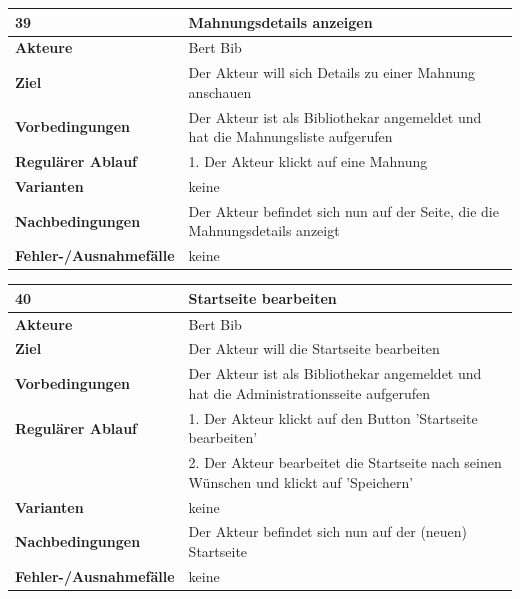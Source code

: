 \documentclass[fontsize=12pt,paper=a4,twoside]{scrartcl}
\begin{document}
\begin{table}[htbp]
\label{39}
\begin{tabular}{|l|p{10cm}|}
\hline 
\textbf{39} & \textbf{Mahnungsdetails anzeigen} \\ \hline
\textbf{Akteure} & Bert Bib\\ \hline
\textbf{Ziel} & Der Akteur will sich Details zu einer Mahnung anschauen \\ \hline
\textbf{Vorbedingungen} & Der Akteur ist als Bibliothekar angemeldet und hat die Mahnungsliste 
aufgerufen \\ \hline
\textbf{Regulärer Ablauf} & 
1. Der Akteur klickt auf eine Mahnung \\
\hline
\textbf{Varianten} & 
keine \\ \hline
\textbf{Nachbedingungen} & Der Akteur befindet sich nun auf der Seite, die die Mahnungsdetails 
anzeigt\\ \hline
\textbf{Fehler-/Ausnahmefälle} & keine\\
\hline
\end{tabular}
\end{table}

\newpage
\begin{table}[htbp]
\label{40}
\begin{tabular}{|l|p{10cm}|}
\hline 
\textbf{40} & \textbf{Startseite bearbeiten} \\ \hline
\textbf{Akteure} & Bert Bib\\ \hline
\textbf{Ziel} & Der Akteur will die Startseite bearbeiten \\ \hline
\textbf{Vorbedingungen} & Der Akteur ist als Bibliothekar angemeldet und hat die 
Administrationsseite aufgerufen\\\hline
\textbf{Regulärer Ablauf} & 
1. Der Akteur klickt auf den Button 'Startseite bearbeiten' \\
&2. Der Akteur bearbeitet die Startseite nach seinen Wünschen und klickt auf 'Speichern'\\
\hline
\textbf{Varianten} & 
keine \\ \hline
\textbf{Nachbedingungen} & Der Akteur befindet sich nun auf der (neuen) Startseite \\ \hline
\textbf{Fehler-/Ausnahmefälle} & keine\\
\hline
\end{tabular}
\end{table}
\end{document}

